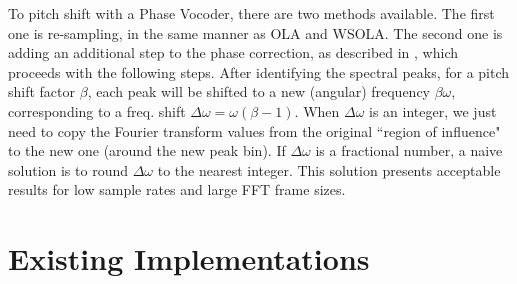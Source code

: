\documentclass{sig-alternate}
\begin{document}
To pitch shift with a Phase Vocoder, there are two methods available. The first one is re-sampling, in the same manner as OLA and WSOLA. The second one is adding an additional step to the phase correction, as described in \cite{phasevocoder:pitchshift}, which proceeds with the following steps. After identifying the spectral peaks, for a pitch shift factor $\beta$, each peak will be shifted to a new (angular) frequency $\beta \omega$, corresponding to a freq. shift $\Delta \omega = \omega(\beta-1)$. When $\Delta \omega$ is an integer, we just need to copy the Fourier transform values from the original ``region of influence" to the new one (around the new peak bin). If $\Delta \omega$ is a fractional number, a naive solution is to round $\Delta \omega$ to the nearest integer. This solution presents acceptable results for low sample rates and large FFT frame sizes.


\section{Existing Implementations}
\end{document}

